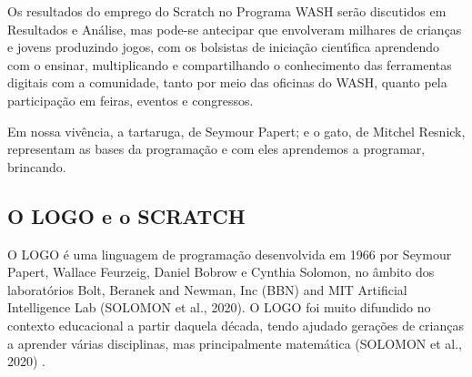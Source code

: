 \documentclass[
12pt,		%
openright,	%
twoside,  %
a4paper,			%
chapter=TITLE,		%
english,			%
french,				%
spanish,			%
brazil				%
]{USPSC-classe/USPSC}
\begin{document}
Os resultados do emprego do Scratch no Programa WASH ser\~ao discutidos em Resultados e An\'alise, mas pode-se antecipar que envolveram milhares de crian\c{c}as e jovens produzindo jogos, com os bolsistas de inicia\c{c}\~ao cient\'{\i}fica aprendendo com o ensinar, multiplicando e compartilhando o conhecimento das ferramentas digitais  com a comunidade, tanto por meio das oficinas do WASH, quanto pela participa\c{c}\~ao em feiras, eventos e congressos.

















Em nossa viv\^encia, a tartaruga, de Seymour Papert; e o gato, de Mitchel Resnick,  representam as bases da  programa\c{c}\~ao e com eles aprendemos a  programar,  brincando.

















\subsection[O LOGO e o SCRATCH]{O LOGO e o SCRATCH}\label{O LOGO e o SCRATCH}
O LOGO \'e uma linguagem de programa\c{c}\~ao desenvolvida em 1966 por Seymour Papert, Wallace Feurzeig, Daniel Bobrow e Cynthia Solomon, no \^ambito dos laborat\'orios Bolt, Beranek and Newman, Inc (BBN) and MIT Artificial Intelligence Lab (SOLOMON et al., 2020). O LOGO foi muito difundido no contexto educacional a partir daquela d\'ecada, tendo ajudado gera\c{c}\~oes de crian\c{c}as a aprender v\'arias disciplinas, mas principalmente matem\'atica  (SOLOMON et al., 2020) .
\end{document}
